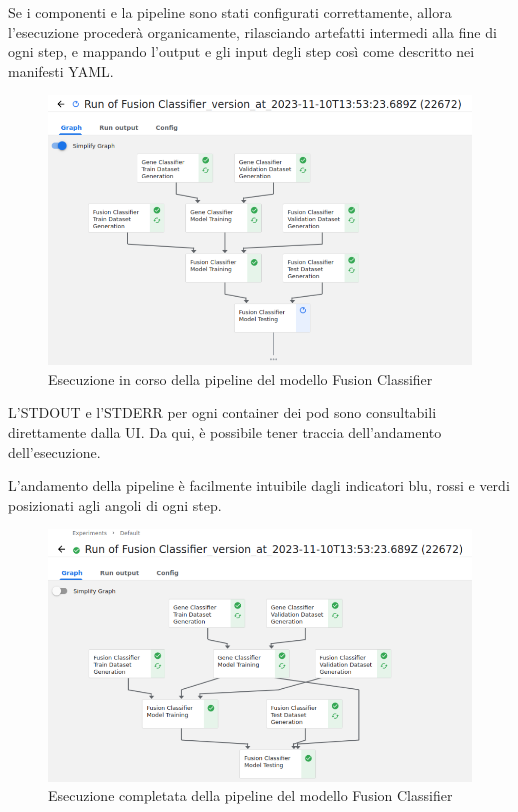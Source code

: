 Se i componenti e la pipeline sono stati configurati correttamente, allora l'esecuzione procederà organicamente, rilasciando artefatti intermedi alla fine di ogni step, e mappando l'output e gli input degli step così come descritto nei manifesti YAML.

\begin{figure}[H]
    \centering
    \includegraphics[width=\linewidth]{figures/ch4and5/fusion_pending.png}
    \caption[Esecuzione in corso della pipeline del modello Fusion Classifier]{Esecuzione in corso della pipeline del modello Fusion Classifier}
    \label{fig:cha6:kf-f-pend}
\end{figure}

L'STDOUT e l'STDERR per ogni container dei pod sono consultabili direttamente dalla UI. Da qui, è possibile tener traccia dell'andamento dell'esecuzione.

L'andamento della pipeline è facilmente intuibile dagli indicatori blu, rossi e verdi posizionati agli angoli di ogni step.

\begin{figure}[H]
    \centering
    \includegraphics[width=\linewidth]{figures/ch4and5/fusion_compl.png}
    \caption[Esecuzione completata della pipeline del modello Fusion Classifier]{Esecuzione completata della pipeline del modello Fusion Classifier}
    \label{fig:cha6:kf-f-done}
\end{figure}

